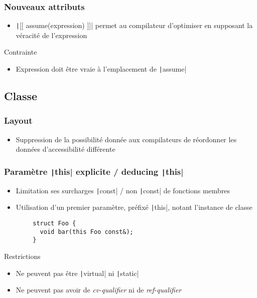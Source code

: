 \documentclass[C++.tex]{subfiles}
\begin{document}
\begin{frame}[fragile]
	\frametitle{Nouveaux attributs}
	\begin{itemize}
		\item \texttt|[[ assume(expression) ]]| permet au compilateur d'optimiser en supposant la véracité de l'expression
	\end{itemize}

	\begin{alertblock}{Contrainte}
		\begin{itemize}
			\item Expression doit être vraie à l'emplacement de \texttt|assume|

		\end{itemize}
	\end{alertblock}

\end{frame}

\subsection*{Classe}
\begin{frame}[fragile]
	\frametitle{Layout}
	\begin{itemize}
		\item Suppression de la possibilité donnée aux compilateurs de réordonner les données d'accessibilité différente
	\end{itemize}

\end{frame}

\begin{frame}[fragile]
	\frametitle{Paramètre \texttt|this| explicite / deducing \texttt|this|}
	\begin{itemize}
		\item Limitation ses surcharges \texttt|const| / non \texttt|const| de fonctions membres
		\item Utilisation d'un premier paramètre, préfixé \texttt|this|, notant l'instance de classe
	\end{itemize}

	\begin{verbatim}
		struct Foo {
		  void bar(this Foo const&);
		}
	\end{verbatim}

	\begin{alertblock}{Restrictions}
		\begin{itemize}
			\item Ne peuvent pas être \texttt|virtual| ni \texttt|static|
			\item Ne peuvent pas avoir de \textit{cv-qualifier} ni de \textit{ref-qualifier}
		\end{itemize}
	\end{alertblock}

\end{frame}
\end{document}
